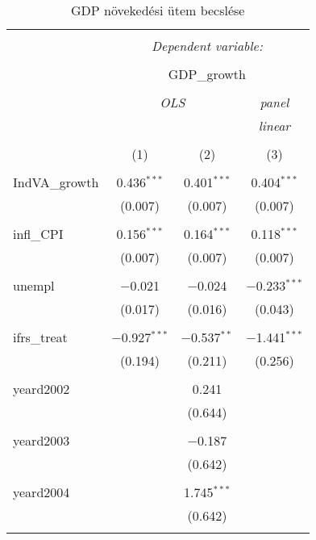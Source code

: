 
\begin{table}[!htbp] \centering 
  \caption{GDP növekedési ütem becslése} 
  \label{} 
\begin{tabular}{@{\extracolsep{5pt}}lccc} 
\\[-1.8ex]\hline 
\hline \\[-1.8ex] 
 & \multicolumn{3}{c}{\textit{Dependent variable:}} \\ 
\cline{2-4} 
\\[-1.8ex] & \multicolumn{3}{c}{GDP\_growth} \\ 
\\[-1.8ex] & \multicolumn{2}{c}{\textit{OLS}} & \textit{panel} \\ 
 & \multicolumn{2}{c}{\textit{}} & \textit{linear} \\ 
\\[-1.8ex] & (1) & (2) & (3)\\ 
\hline \\[-1.8ex] 
 IndVA\_growth & 0.436$^{***}$ & 0.401$^{***}$ & 0.404$^{***}$ \\ 
  & (0.007) & (0.007) & (0.007) \\ 
  & & & \\ 
 infl\_CPI & 0.156$^{***}$ & 0.164$^{***}$ & 0.118$^{***}$ \\ 
  & (0.007) & (0.007) & (0.007) \\ 
  & & & \\ 
 unempl & $-$0.021 & $-$0.024 & $-$0.233$^{***}$ \\ 
  & (0.017) & (0.016) & (0.043) \\ 
  & & & \\ 
 ifrs\_treat & $-$0.927$^{***}$ & $-$0.537$^{**}$ & $-$1.441$^{***}$ \\ 
  & (0.194) & (0.211) & (0.256) \\ 
  & & & \\ 
 yeard2002 &  & 0.241 &  \\ 
  &  & (0.644) &  \\ 
  & & & \\ 
 yeard2003 &  & $-$0.187 &  \\ 
  &  & (0.642) &  \\ 
  & & & \\ 
 yeard2004 &  & 1.745$^{***}$ &  \\ 
  &  & (0.642) &  \\ 
  & & & \\ 

\end{tabular}
\end{table}
